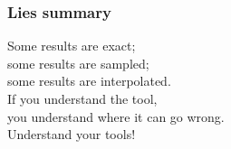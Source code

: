 \begin{frame}
  \frametitle{Lies  summary}
  
    Some results are exact;\\
    some results are sampled;\\
    some results are interpolated.\\[1em]

    If you understand the tool, \\
    you understand where it can go wrong.\\[1em]

    Understand your tools!
  
\end{frame}





